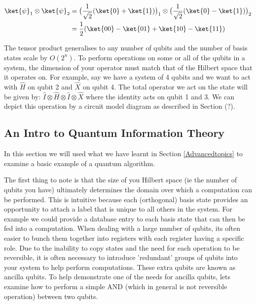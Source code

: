 \begin{equation}
    \begin{split}
        \ket{\psi}_1 \otimes \ket{\psi}_2 &= \big(\frac{1}{\sqrt{2}}(\ket{0}+\ket{1})\big)_1 \otimes \big(\frac{1}{\sqrt{2}}(\ket{0}-\ket{1})\big)_2\\
        &= \frac{1}{2}(\ket{00}-\ket{01}+\ket{10}-\ket{11})
    \end{split}
\end{equation}

The tensor product generalises to any number of qubits and the number of basis states scale by $O(2^n)$. To perform operations on some or all of the qubits in a system, the dimension of your operator must match that of the Hilbert space that it operates on. For example, say we have a system of 4 qubits and we want to act with $\hat{H}$ on qubit 2 and $\hat{X}$ on qubit 4. The total operator we act on the state will be given by: $\hat{I}\otimes\hat{H}\otimes\hat{I}\otimes\hat{X}$ where  the identity acts on qubit 1 and 3. We can depict this operation by a circuit model diagram as described in Section (?).\\

\subsection{An Intro to Quantum Information Theory}

In this section we will used what we have learnt in Section \ref{Advancedtopics} to examine a basic example of a quantum algorithm.

The first thing to note is that the size of you Hilbert space (ie the number of qubits you have) ultimately determines the domain over which a computation can be performed. This is intuitive because each (orthogonal) basis state provides an opportunity to attach a label that is unique to all others in the system. For example we could provide a database entry to each basis state that can then be fed into a computation. When dealing with a large number of qubits, its often easier to bunch them together into registers with each register having a specific role. Due to the inability to copy states and the need for each operation to be reversible, it is often necessary to introduce 'redundant' groups of qubits into your system to help perform computations. These extra qubits are known as ancilla qubits. To help demonstrate one of the needs for ancilla qubits, lets examine how to perform a simple AND (which in general is not reversible operation) between two qubits.\\

